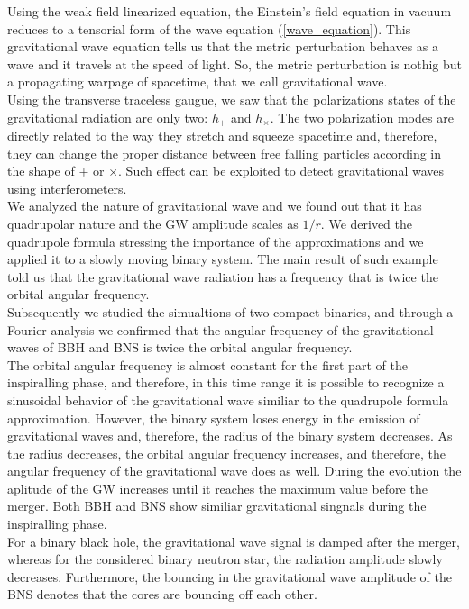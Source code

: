Using the weak field linearized equation, the Einstein's field equation in vacuum reduces to a tensorial form of the wave equation (\ref{wave_equation}).
This gravitational wave equation tells us that the metric perturbation behaves as a wave and it travels at the speed of light.
So, the metric perturbation is nothig but a propagating warpage of spacetime, that we call gravitational wave.\\
Using the transverse traceless gaugue, we saw that the polarizations states of the gravitational radiation are only two: $h_{+}$ and $h_{\times}$.
The two polarization modes are directly related to the way they stretch and squeeze spacetime and, therefore, they can change the proper distance between free falling particles according in the shape of $+$ or $\times$.
Such effect can be exploited to detect gravitational waves using interferometers.\\
We analyzed the nature of gravitational wave  and we found out that it has quadrupolar nature and the GW amplitude scales as $1/r$.
We derived the quadrupole formula stressing the importance of the approximations and we applied it to a slowly moving binary system.
The main result of such example told us that the gravitational wave radiation has a frequency that is twice the orbital angular frequency.\\
Subsequently we studied the simualtions of two compact binaries, and through a Fourier analysis we confirmed that the angular frequency of the gravitational waves of BBH and BNS is twice the orbital angular frequency.\\
The orbital angular frequency is almost constant for the first part of the inspiralling phase, and therefore, in this time range it is possible to recognize a sinusoidal behavior of the gravitational wave similiar to the quadrupole formula approximation.
However, the binary system loses energy in the emission of gravitational waves and, therefore, the radius of the binary system decreases. 
As the radius decreases, the orbital angular frequency increases, and therefore, the angular frequency of the gravitational wave does as well. 
During the evolution the aplitude of the GW increases until it reaches the maximum value before the merger.
Both BBH and BNS show similiar gravitational singnals during the inspiralling phase.\\
For a binary black hole, the gravitational wave signal is damped after the merger, whereas for the considered binary neutron star, the radiation amplitude slowly decreases.
Furthermore, the bouncing in the gravitational wave amplitude of the BNS denotes that the cores are bouncing off each other.\\
